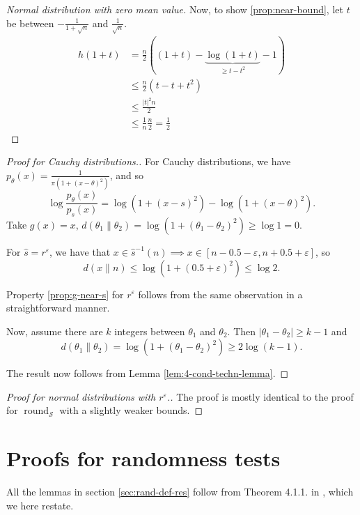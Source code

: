 \documentclass{article}
\theoremstyle{definition}
\theoremstyle{definition}
\begin{document}
\begin{proof}[Normal distribution with zero mean value]
	Now, to show \ref{prop:near-bound}, let $t$ be between $ - \frac{1}{1+\sqrt{n}}$ and $\frac{1}{\sqrt{n}}$.
	\begin{align*}
		h(1+t) &= \frac{n}{2}((1+t) - \underbrace{\log (1+t)}_{\ge t - t^2} - 1)
		\\&\le \frac{n}{2}(t - t + t^2)\\
		&\le \frac{|t|^2 n}{2}
		\\&\le \frac{1}{n}\frac{n}{2} = \frac{1}{2}
	\end{align*}
\end{proof}

\begin{proof}[Proof for Cauchy distributions.]
    For Cauchy distributions, we have $p_\theta(x)=\frac{1}{\pi(1+(x-\theta)^2)}$, and so
    \[
        \log \frac{p_\theta(x)}{p_s(x)} = \log \left(1+(x-s)^2\right) - \log \left(1+(x-\theta)^2\right).
    \]
    Take $g(x)=x$, $d(\theta_1 \| \theta_2) = \log\left(1 + (\theta_1 - \theta_2)^2 \right) \ge \log1=0$.

    For $\hat{s}=r^\varepsilon$, we have that $x \in \hat{s}^{-1}(n) \implies x \in [n-0.5-\varepsilon, n +0.5+\varepsilon]$, so 
    \[
        d(x\|n) \le \log (1+(0.5+\varepsilon)^2)\le\log 2.
    \]

    Property \ref{prop:g-near-s} for $r^\varepsilon$ follows from the same observation in a straightforward manner.

    Now, assume there are $k$ integers between $\theta_1$ and $\theta_2$. Then $|\theta_1 - \theta_2| \ge k-1$ and
    \[ 
    d(\theta_1\|\theta_2) = \log\left(1 + (\theta_1 - \theta_2)^2 \right) \ge 2\log(k-1).
    \]

    The result now follows from Lemma \ref{lem:4-cond-techn-lemma}.
\end{proof}

\begin{proof}[Proof for normal distributions with $r^\varepsilon$.]
    The proof is mostly identical to the proof for $\operatorname{round}_\mathcal{S}$ with a slightly weaker bounds.
\end{proof}

\section{Proofs for randomness tests}
All the lemmas in section \ref{sec:rand-def-res} follow from Theorem 4.1.1. in \cite{gacs2021lecturenotes}, which we here restate.
\end{document}
